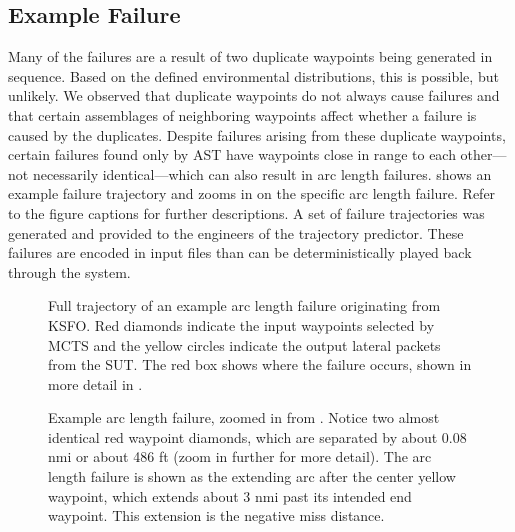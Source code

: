 \subsection{Example Failure}
Many of the failures are a result of two duplicate waypoints being generated in sequence.
Based on the defined environmental distributions, this is possible, but unlikely.
We observed that duplicate waypoints do not always cause failures and that certain assemblages of neighboring waypoints affect whether a failure is caused by the duplicates.
Despite failures arising from these duplicate waypoints, certain failures found only by AST have waypoints close in range to each other---not necessarily identical---which can also result in arc length failures. 
 shows an example failure trajectory and  zooms in on the specific arc length failure.
Refer to the figure captions for further descriptions.
A set of failure trajectories was generated and provided to the engineers of the trajectory predictor.
These failures are encoded in input files than can be deterministically played back through the system.


\begin{figure}[t!]
\noindent{}
\caption{Full trajectory of an example arc length failure originating from KSFO. Red diamonds indicate the input waypoints selected by MCTS and the yellow circles indicate the output lateral packets from the SUT. The red box shows where the failure occurs, shown in more detail in .}
\label{fig:example_failure}
\end{figure}

\begin{figure}[b!]
\noindent{}
\caption{Example arc length failure, zoomed in from . Notice two almost identical red waypoint diamonds, which are separated by about 0.08 \si{nmi} or about 486 \si{ft} (zoom in further for more detail). The arc length failure is shown as the extending arc after the center yellow waypoint, which extends about 3 \si{nmi} past its intended end waypoint. This extension is the negative miss distance.}
\label{fig:example_failure_zoomed}
\end{figure}

